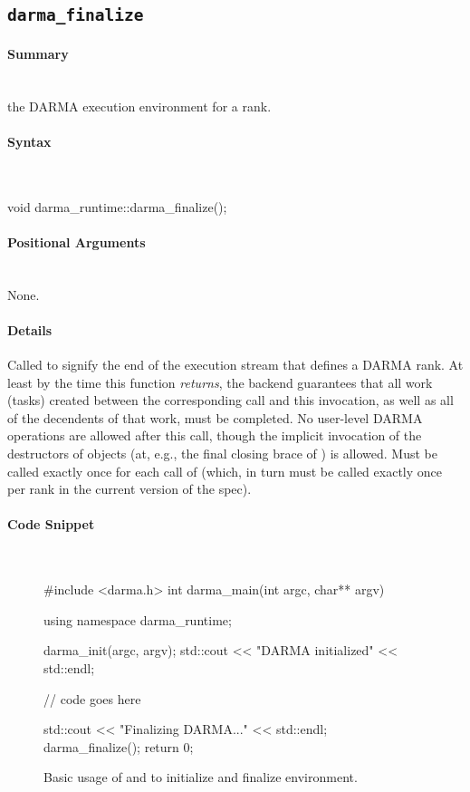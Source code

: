 
\subsection{\texttt{darma\_finalize}}
\label{ssec:api_fe_finalize}

\paragraph{Summary}\mbox{}\\
 the \gls{DARMA} execution environment for a \gls{rank}.

\paragraph{Syntax}\mbox{}\\ 
\begin{CppCode}
void darma_runtime::darma_finalize();
\end{CppCode}

\paragraph{Positional Arguments}\mbox{} \\
None. 

\paragraph{Details}\mbox{} 
Called to signify the end of the \gls{execution stream} that defines a
\gls{DARMA}
\gls{rank}.  At
least by the time this function {\em returns}, the backend guarantees that all work
(tasks) created between the corresponding  call and this
invocation, as well as all of the decendents of that work, must be
completed.  No user-level \gls{DARMA} operations are allowed after this call, though
the implicit invocation of the destructors of  objects
(at, e.g., the final closing brace of ) is allowed.  Must
be called exactly once for each call of  (which, in turn
must be called exactly once per \gls{rank} in the current version of the spec).

\paragraph{Code Snippet}\mbox{} \\
\begin{figure}[!h]
\begin{CppCodeNumb}
#include <darma.h>
int darma_main(int argc, char** argv)
{
  using namespace darma_runtime;

  darma_init(argc, argv);
  std::cout << "DARMA initialized" << std::endl;

  // code goes here

  std::cout << "Finalizing DARMA..." << std::endl;
  darma_finalize();
  return 0;
}
\end{CppCodeNumb}
\caption{Basic usage of \protect{} and \protect{} 
to initialize and finalize environment.}
\label{fig:fe_api_init}
\end{figure}

